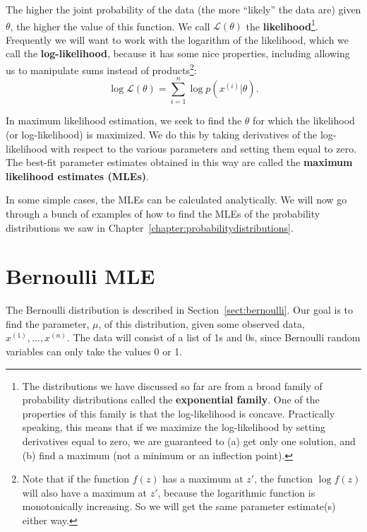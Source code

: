 The higher the joint probability of the data (the more ``likely'' the data are) given $\theta$, the higher the value of this function. We call $\mathcal{L}(\theta)$ the \textbf{likelihood}\footnote{The distributions we have discussed so far are from a broad family of probability distributions called the {\bf exponential family}. One of the properties of this family is that the log-likelihood is concave. Practically speaking, this means that if we maximize the log-likelihood by setting derivatives equal to zero, we are guaranteed to (a) get only one solution, and (b) find a maximum (not a minimum or an inflection point).}. Frequently we will want to work with the logarithm of the likelihood, which we call the \textbf{log-likelihood}, because it has some nice properties, including allowing us to manipulate sums instead of products\footnote{Note that if the function $f(z)$ has a maximum at $z'$, the function $\log f(z)$ will also have a maximum at $z'$, because the logarithmic function is monotonically increasing. So we will get the same parameter estimate(s) either way.}:
$$ \log \mathcal{L}(\theta) = \sum_{i=1}^n \log p(x^{(i)}|\theta). $$

In maximum likelihood estimation, we seek to find the $\theta$ for which the likelihood (or log-likelihood) is maximized. We do this by taking derivatives of the log-likelihood with respect to the various parameters and setting them equal to zero. The best-fit parameter estimates obtained in this way are called the \textbf{maximum likelihood estimates (MLEs)}. 

In some simple cases, the MLEs can be calculated analytically. We will now go through a bunch of examples of how to find the MLEs of the probability distributions we saw in Chapter~\ref{chapter:probabilitydistributions}. 

\section{Bernoulli MLE}

The Bernoulli distribution is described in Section~\ref{sect:bernoulli}. Our goal is to find the parameter, $\mu$, of this distribution, given some observed data, $x^{(1)}, \dots, x^{(n)}$. The data will consist of a list of 1s and 0s, since Bernoulli random variables can only take the values 0 or 1.

